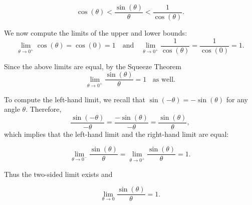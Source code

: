 \documentclass[handout]{ximera}
\begin{document}
\begin{example}[example 3]
\[
\cos(\theta)  < \frac{\sin(\theta)}{\theta} < \frac{1}{\cos(\theta)}.
\]

We now compute the limits of the upper and lower bounds:
\[
\lim_{\theta \to 0^+} \cos(\theta) = \cos(0) = 1 \quad \text{and} \quad \lim_{\theta \to 0^+} \frac{1}{\cos(\theta)} = \frac{1}{\cos(0)} = 1. 
\]

Since the above limits are equal, by the Squeeze Theorem 
\[
\lim_{\theta \to 0^+} \frac{\sin(\theta)}{\theta} = 1 \;\; \text{  as well.}
\]

To compute the left-hand limit, we recall that $\sin(-\theta) = -\sin(\theta)$ for any angle $\theta$.
Therefore,
\[
\frac{\sin(-\theta)}{-\theta} = \frac{-\sin(\theta)}{-\theta} = \frac{\sin(\theta)}{\theta},
\]
which implies that the left-hand limit and the right-hand limit are equal:

\[
\lim_{\theta \to 0^-} \frac{\sin(\theta)}{\theta} =\lim_{\theta \to 0^+} \frac{\sin(\theta)}{\theta} = 1. 
\]

Thus the two-sided limit exists and

\[
\lim_{\theta \to 0} \frac{\sin(\theta)}{\theta} =1. 
\]


\end{example}
\end{document}
